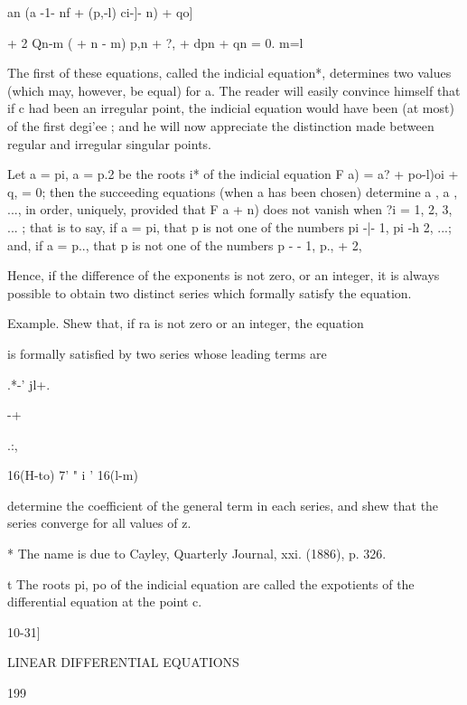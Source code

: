 an  (a -1- nf + (p,-l) ci-]- n) + qo] 

+ 2 Qn-m  (  + n - m) p,n + ?,   + dpn + qn = 0. 
m=l 

The first of these equations, called the indicial equation*, determines two 
values (which may, however, be equal) for a. The reader will easily convince 
himself that if c had been an irregular point, the indicial equation would have 
been (at most) of the first degi'ee ; and he will now appreciate the distinction 
made between regular and irregular singular points. 

Let a = pi, a = p.2 be the roots i* of the indicial equation 
F a) = a? +  po-l)oi + q, = 0; 
then the succeeding equations (when a has been chosen) determine a , a , ..., 
in order, uniquely, provided that F a + n) does not vanish when ?i = 1, 2, 3, ... ; 
that is to say, if a = pi, that p  is not one of the numbers pi -|- 1, pi -h 2, ...; 
and, if a = p.., that p  is not one of the numbers p  - - 1, p., + 2, 

Hence, if the difference of the exponents is not zero, or an integer, it is 
always possible to obtain two distinct series which formally satisfy the 
equation. 

Example. Shew that, if ra is not zero or an integer, the equation 



is formally satisfied by two series whose leading terms are 



.*-' jl+. 



-+ 



.:,  



16(H-to) 7' " i  ' 16(l-m) 

determine the coefficient of the general term in each series, and shew that the series 
  converge for all values of z. 

* The name is due to Cayley, Quarterly Journal, xxi. (1886), p. 326. 

t The roots pi, po of the indicial equation are called the expotients of the differential 
equation at the point c. 



10-31] 



LINEAR DIFFERENTIAL EQUATIONS 



199 



